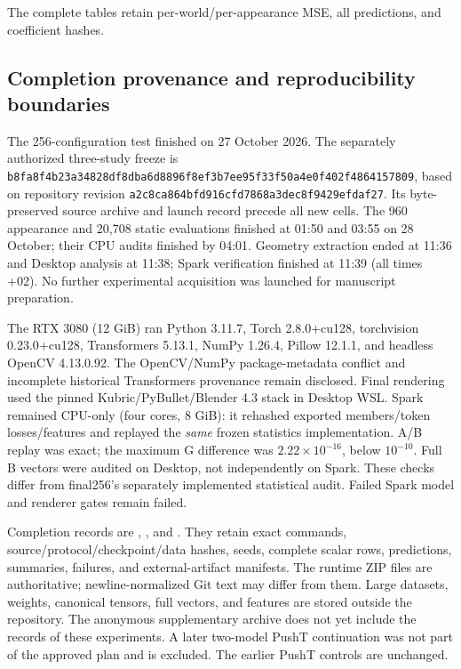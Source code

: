 The complete tables retain per-world/per-appearance MSE, all predictions, and coefficient hashes.

\subsection{Completion provenance and reproducibility boundaries}
The 256-configuration test finished on 27 October 2026. The separately authorized three-study freeze is \texttt{b8fa8f4b23a34828\allowbreak df8dba6d8896f8ef\allowbreak 3b7ee95f33f50a4e\allowbreak 0f402f4864157809}, based on repository revision \texttt{a2c8ca864bfd916cfd7868a3dec8f9429efdaf27}. Its byte-preserved source archive and launch record precede all new cells. The 960 appearance and 20,708 static evaluations finished at 01:50 and 03:55 on 28 October; their CPU audits finished by 04:01. Geometry extraction ended at 11:36 and Desktop analysis at 11:38; Spark verification finished at 11:39 (all times +02). No further experimental acquisition was launched for manuscript preparation.

The RTX 3080 (12 GiB) ran Python 3.11.7, Torch 2.8.0+cu128, torchvision 0.23.0+cu128, Transformers 5.13.1, NumPy 1.26.4, Pillow 12.1.1, and headless OpenCV 4.13.0.92. The OpenCV/NumPy package-metadata conflict and incomplete historical Transformers provenance remain disclosed. Final rendering used the pinned Kubric/PyBullet/Blender 4.3 stack in Desktop WSL. Spark remained CPU-only (four cores, 8 GiB): it rehashed exported members/token losses/features and replayed the \emph{same} frozen statistics implementation. A/B replay was exact; the maximum G difference was $2.22\times10^{-16}$, below $10^{-10}$. Full B vectors were audited on Desktop, not independently on Spark. These checks differ from final256's separately implemented statistical audit. Failed Spark model and renderer gates remain failed.

Completion records are , , and . They retain exact commands, source/protocol/checkpoint/data hashes, seeds, complete scalar rows, predictions, summaries, failures, and external-artifact manifests. The runtime ZIP files are authoritative; newline-normalized Git text may differ from them. Large datasets, weights, canonical tensors, full vectors, and features are stored outside the repository. The anonymous supplementary archive does not yet include the records of these experiments. A later two-model PushT continuation was not part of the approved plan and is excluded. The earlier PushT controls are unchanged.
\FloatBarrier
